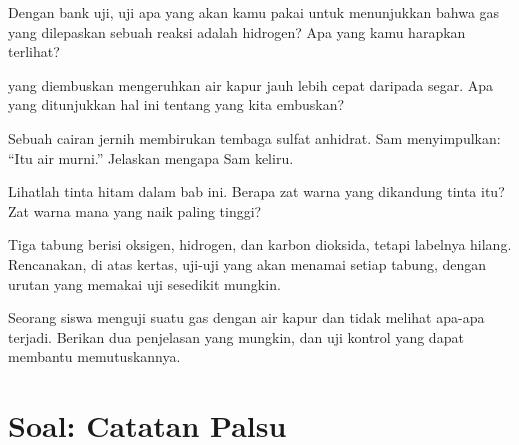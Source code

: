 \begin{exercise}[$\star\star$]\label{exo:g7:identifying-substances:7}
Dengan bank uji, uji apa yang akan kamu pakai untuk menunjukkan bahwa
gas yang dilepaskan sebuah reaksi adalah hidrogen? Apa yang kamu
harapkan terlihat?
\end{exercise}

\begin{exercise}[$\star\star$]\label{exo:g7:identifying-substances:8}
 yang diembuskan mengeruhkan air kapur jauh lebih cepat daripada
 segar. Apa yang ditunjukkan hal ini tentang  yang kita
embuskan?
\end{exercise}

\begin{exercise}[$\star\star$]\label{exo:g7:identifying-substances:9}
Sebuah cairan jernih membirukan tembaga sulfat anhidrat. Sam
menyimpulkan: ``Itu air murni.'' Jelaskan mengapa Sam keliru.
\end{exercise}

\begin{exercise}[$\star\star$]\label{exo:g7:identifying-substances:10}
Lihatlah  tinta hitam dalam bab ini. Berapa zat warna yang
dikandung tinta itu? Zat warna mana yang naik paling tinggi?
\end{exercise}

\begin{exercise}[$\star\star\star$]\label{exo:g7:identifying-substances:11}
Tiga tabung berisi oksigen, hidrogen, dan karbon dioksida, tetapi
labelnya hilang. Rencanakan, di atas kertas, uji-uji yang akan
menamai setiap tabung, dengan urutan yang memakai uji sesedikit
mungkin.
\end{exercise}

\begin{exercise}[$\star\star\star$]\label{exo:g7:identifying-substances:12}
Seorang siswa menguji suatu gas dengan air kapur dan tidak melihat
apa-apa terjadi. Berikan dua penjelasan yang mungkin, dan uji kontrol
yang dapat membantu memutuskannya.
\end{exercise}

\section{Soal: Catatan Palsu}


